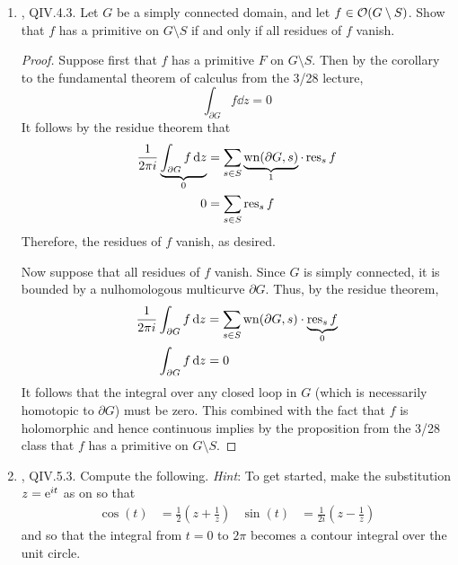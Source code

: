 \documentclass[../psets.tex]{subfiles}
\begin{document}
\begin{enumerate}[label={\textbf{\arabic*.}}]
    \item \textcite{bib:FischerLieb}, QIV.4.3. Let $G$ be a simply connected domain, and let $f\in\mO(G\setminus S)$. Show that $f$ has a primitive on $G\setminus S$ if and only if all residues of $f$ vanish.
    \begin{proof}
        Suppose first that $f$ has a primitive $F$ on $G\setminus S$. Then by the corollary to the fundamental theorem of calculus from the 3/28 lecture,
        \begin{equation*}
            \int_{\partial G}f\dd{z} = 0
        \end{equation*}
        It follows by the residue theorem that
        \begin{align*}
            \frac{1}{2\pi i}\underbrace{\int_{\partial G}f\dd{z}}_0 &= \sum_{s\in S}\underbrace{\wn(\partial G,s)}_1\cdot\res_sf\\
            0 &= \sum_{s\in S}\res_sf
        \end{align*}
        Therefore, the residues of $f$ vanish, as desired.\par
        Now suppose that all residues of $f$ vanish. Since $G$ is simply connected, it is bounded by a nulhomologous multicurve $\partial G$. Thus, by the residue theorem,
        \begin{align*}
            \frac{1}{2\pi i}\int_{\partial G}f\dd{z} &= \sum_{s\in S}\wn(\partial G,s)\cdot\underbrace{\res_sf}_0\\
            \int_{\partial G}f\dd{z} &= 0
        \end{align*}
        It follows that the integral over any closed loop in $G$ (which is necessarily homotopic to $\partial G$) must be zero. This combined with the fact that $f$ is holomorphic and hence continuous implies by the proposition from the 3/28 class that $f$ has a primitive on $G\setminus S$.
    \end{proof}
    \item \textcite{bib:FischerLieb}, QIV.5.3. Compute the following. \emph{Hint}: To get started, make the substitution $z=\e[it]$ as on \textcite[127]{bib:FischerLieb} so that
    \begin{align*}
        \cos(t) &= \frac{1}{2}\left( z+\frac{1}{z} \right)&
        \sin(t) &= \frac{1}{2i}\left( z-\frac{1}{z} \right)
    \end{align*}
    and so that the integral from $t=0$ to $2\pi$ becomes a contour integral over the unit circle.
    \begin{enumerate}

\end{enumerate}
\end{enumerate}
\end{document}
